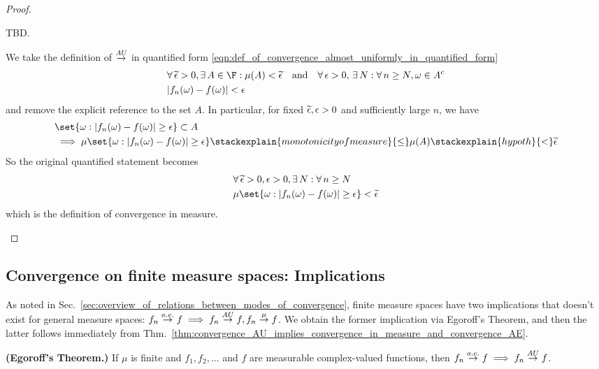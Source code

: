 \documentclass{article} %
\begin{document}
\begin{proof}
\begin{alphabate}
\item TBD.
\item We take the definition of $\stackrel{AU}{\to}$ in quantified form \eqref{eqn:def_of_convergence_almost_uniformly_in_quantified_form} 
\begin{align*}
&\forall \, \epsilontilde >0, \exists \, A \in \F : \mu(A) < \epsilontilde \quad \text{and} \quad \forall \, \epsilon >0, \, \exists \, N : \forall \, n \geq N, \omega \in A^c \\
& |f_n(\omega) - f(\omega) | < \epsilon 
\end{align*}
and remove the explicit reference to the set $A$. In particular, for fixed $\widetilde{\epsilon}, \epsilon>0$ and sufficiently large $n$, we have
\begin{align*} 
& \set{\omega : |f_n(\omega) - f(\omega) | \geq \epsilon  } \subset A \\
&\implies \mu\set{\omega : |f_n(\omega) - f(\omega) | \geq \epsilon  } \stackexplain{monotonicity of measure}{\leq} \mu(A) \stackexplain{hypoth}{<} \epsilontilde 
\end{align*}
So the original quantified statement becomes
\begin{align*}
&\forall \, \epsilontilde >0,  \epsilon >0, \exists \, N : \forall \, n \geq N \\
& \mu\set{\omega : |f_n(\omega) - f(\omega) | \geq \epsilon  } < \epsilontilde 
\end{align*}
which is the definition of convergence in measure. 
\end{alphabate}
\end{proof}

\subsection{Convergence on finite measure spaces: Implications}

As noted in Sec.~\ref{sec:overview_of_relations_between_modes_of_convergence}, finite measure spaces have two implications that doesn't exist for general measure spaces:  $f_n \stackrel{a.e.}{\to} f \implies f_n \stackrel{AU}{\to} f, f_n \stackrel{\mu}{\to} f$.  We obtain the former implication via Egoroff's Theorem, and then the latter follows immediately from Thm.~\ref{thm:convergence_AU_implies_convergence_in_measure_and_convergence_AE}.

\begin{theorem}\textbf{(Egoroff's Theorem.)} If $\mu$ is finite and $f_1, f_2, \hdots$ and $f$ are measurable complex-valued functions, then $f_n \stackrel{a.e.}{\to} f \implies f_n \stackrel{AU}{\to} f$.
\label{thm:egoroffs_theorem}
\end{theorem}
\end{document}
